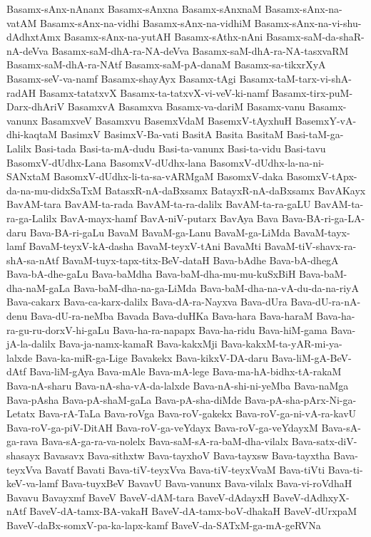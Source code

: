 {Basamx-sAnx-nAnanx
Basamx-sAnxna
Basamx-sAnxnaM
Basamx-sAnx-na-vatAM
Basamx-sAnx-na-vidhi
Basamx-sAnx-na-vidhiM
Basamx-sAnx-na-vi-shu-dAdhxtAmx
Basamx-sAnx-na-yutAH
Basamx-sAthx-nAni
Basamx-saM-da-shaR-nA-deVva
Basamx-saM-dhA-ra-NA-deVva
Basamx-saM-dhA-ra-NA-tasxvaRM
Basamx-saM-dhA-ra-NAtf
Basamx-saM-pA-danaM
Basamx-sa-tikxrXyA
Basamx-seV-va-namf
Basamx-shayAyx
Basamx-tAgi
Basamx-taM-tarx-vi-shA-radAH
Basamx-tatatxvX
Basamx-ta-tatxvX-vi-veV-ki-namf
Basamx-tirx-puM-Darx-dhAriV
BasamxvA
Basamxva
Basamx-va-dariM
Basamx-vanu
Basamx-vanunx
BasamxveV
Basamxvu
BasemxVdaM
BasemxV-tAyxhuH
BasemxY-vA-dhi-kaqtaM
BasimxV
BasimxV-Ba-vati
BasitA
Basita
BasitaM
Basi-taM-ga-Lalilx
Basi-tada
Basi-ta-mA-dudu
Basi-ta-vanunx
Basi-ta-vidu
Basi-tavu
BasomxV-dUdhx-Lana
BasomxV-dUdhx-lana
BasomxV-dUdhx-la-na-ni-SANxtaM
BasomxV-dUdhx-li-ta-sa-vARMgaM
BasomxV-daka
BasomxV-tApx-da-na-mu-didxSaTxM
BatasxR-nA-daBxsamx
BatayxR-nA-daBxsamx
BavAKayx
BavAM-tara
BavAM-ta-rada
BavAM-ta-ra-dalilx
BavAM-ta-ra-gaLU
BavAM-ta-ra-ga-Lalilx
BavA-mayx-hamf
BavA-niV-putarx
BavAya
Bava
Bava-BA-ri-ga-LA-daru
Bava-BA-ri-gaLu
BavaM
BavaM-ga-Lanu
BavaM-ga-LiMda
BavaM-tayx-lamf
BavaM-teyxV-kA-dasha
BavaM-teyxV-tAni
BavaMti
BavaM-tiV-shavx-ra-shA-sa-nAtf
BavaM-tuyx-tapx-titx-BeV-dataH
Bava-bAdhe
Bava-bA-dhegA
Bava-bA-dhe-gaLu
Bava-baMdha
Bava-baM-dha-mu-mu-kuSxBiH
Bava-baM-dha-naM-gaLa
Bava-baM-dha-na-ga-LiMda
Bava-baM-dha-na-vA-du-da-na-riyA
Bava-cakarx
Bava-ca-karx-dalilx
Bava-dA-ra-Nayxva
Bava-dUra
Bava-dU-ra-nA-denu
Bava-dU-ra-neMba
Bavada
Bava-duHKa
Bava-hara
Bava-haraM
Bava-ha-ra-gu-ru-dorxV-hi-gaLu
Bava-ha-ra-napapx
Bava-ha-ridu
Bava-hiM-gama
Bava-jA-la-dalilx
Bava-ja-namx-kamaR
Bava-kakxMji
Bava-kakxM-ta-yAR-mi-ya-lalxde
Bava-ka-miR-ga-Lige
Bavakekx
Bava-kikxV-DA-daru
Bava-liM-gA-BeV-dAtf
Bava-liM-gAya
Bava-mAle
Bava-mA-lege
Bava-ma-hA-bidhx-tA-rakaM
Bava-nA-sharu
Bava-nA-sha-vA-da-lalxde
Bava-nA-shi-ni-yeMba
Bava-naMga
Bava-pAsha
Bava-pA-shaM-gaLa
Bava-pA-sha-diMde
Bava-pA-sha-pArx-Ni-ga-Letatx
Bava-rA-TaLa
Bava-roVga
Bava-roV-gakekx
Bava-roV-ga-ni-vA-ra-kavU
Bava-roV-ga-piV-DitAH
Bava-roV-ga-veYdayx
Bava-roV-ga-veYdayxM
Bava-sA-ga-rava
Bava-sA-ga-ra-va-nolelx
Bava-saM-sA-ra-baM-dha-vilalx
Bava-satx-diV-shasayx
Bavasavx
Bava-sithxtw
Bava-tayxhoV
Bava-tayxsw
Bava-tayxtha
Bava-teyxVva
Bavatf
Bavati
Bava-tiV-teyxVva
Bava-tiV-teyxVvaM
Bava-tiVti
Bava-ti-keV-va-lamf
Bava-tuyxBeV
BavavU
Bava-vanunx
Bava-vilalx
Bava-vi-roVdhaH
Bavavu
Bavayxmf
BaveV
BaveV-dAM-tara
BaveV-dAdayxH
BaveV-dAdhxyX-nAtf
BaveV-dA-tamx-BA-vakaH
BaveV-dA-tamx-boV-dhakaH
BaveV-dUrxpaM
BaveV-daBx-somxV-pa-ka-lapx-kamf
BaveV-da-SATxM-ga-mA-geRVNa
}
